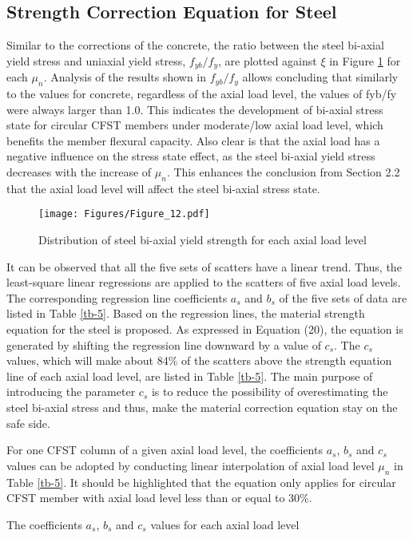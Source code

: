 \documentclass[12pt,a4]{article}
\begin{document}
	\subsection{Strength Correction Equation for Steel}
	Similar to the corrections of the concrete, the ratio between the steel bi-axial yield stress and uniaxial yield stress, $f_{yb}/f_y$, are plotted against $ξ$ in Figure \ref{fig-11} for each $μ_n$. Analysis of the results shown in $f_{yb}/f_y$ allows concluding that similarly to the values for concrete, regardless of the axial load level, the values of fyb/fy were always larger than 1.0. This indicates the development of bi-axial stress state for circular CFST members under moderate/low axial load level, which benefits the member flexural capacity. Also clear is that the axial load has a negative influence on the stress state effect, as the steel bi-axial yield stress decreases with the increase of $μ_n$. This enhances the conclusion from Section 2.2 that the axial load level will affect the steel bi-axial stress state.
	\par
	\begin{figure}[h]
		\centering
		\texttt{[image: Figures/Figure\_12.pdf]}
		\caption{Distribution of steel bi-axial yield strength for each axial load level}
		\label{fig-11}
	\end{figure}
	\par
	It can be observed that all the five sets of scatters have a linear trend. Thus, the least-square linear regressions are applied to the scatters of five axial load levels. The corresponding regression line coefficients $a_s$ and $b_s$ of the five sets of data are listed in Table \ref{tb-5}. Based on the regression lines, the material strength equation for the steel is proposed. As expressed in Equation (20), the equation is generated by shifting the regression line downward by a value of $c_s$. The $c_s$ values, which will make about 84\% of the scatters above the strength equation line of each axial load level, are listed in Table \ref{tb-5}. The main purpose of introducing the parameter $c_s$ is to reduce the possibility of overestimating the steel bi-axial stress and thus, make the material correction equation stay on the safe side.
	\par
	For one CFST column of a given axial load level, the coefficients $a_s$, $b_s$ and $c_s$ values can be adopted by conducting linear interpolation of axial load level $μ_n$ in Table \ref{tb-5}. It should be highlighted that the equation only applies for circular CFST member with axial load level less than or equal to 30\%.
	\par
	\begin{table}
		\caption{The coefficients $a_s$, $b_s$ and $c_s$ values for each axial load level}
		\label{tb-5}
	\end{table}
	\par
\end{document}

